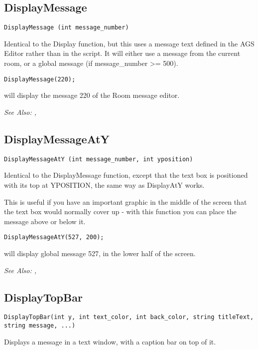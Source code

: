 \subsection{DisplayMessage}\label{DisplayMessage}%

\begin{verbatim}
DisplayMessage (int message_number)
\end{verbatim}
Identical to the Display function, but this uses a message text defined in
the AGS Editor rather than in the script. It will either use a message
from the current room, or a global message (if message_number >= 500).

\begin{verbatim}
DisplayMessage(220);
\end{verbatim}
will display the message 220 of the Room message editor.

\it{See Also:} , 


\subsection{DisplayMessageAtY}\label{DisplayMessageAtY}%

\begin{verbatim}
DisplayMessageAtY (int message_number, int yposition)
\end{verbatim}
Identical to the DisplayMessage function, except that the text box
is positioned with its top at YPOSITION, the same way as DisplayAtY
works.

This is useful if you have an important graphic in the middle of the screen that
the text box would normally cover up - with this function you can place the message
above or below it.

\begin{verbatim}
DisplayMessageAtY(527, 200);
\end{verbatim}
will display global message 527, in the lower half of the screen.

\it{See Also:} , 



\subsection{DisplayTopBar}\label{DisplayTopBar}%

\begin{verbatim}
DisplayTopBar(int y, int text_color, int back_color, string titleText, string message, ...)
\end{verbatim}
Displays a message in a text window, with a caption bar on top of it.

